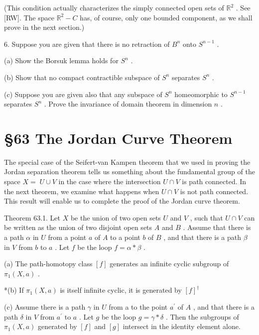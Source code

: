\documentclass[10pt]{article}
\begin{document}
(This condition actually characterizes the simply connected open sets of \({\mathbb{R}}^{2}\) . See [RW]. The space \({\mathbb{R}}^{2} - C\) has, of course, only one bounded component, as we shall prove in the next section.)

6. Suppose you are given that there is no retraction of \({B}^{n}\) onto \({S}^{n - 1}\) .

(a) Show the Borsuk lemma holds for \({S}^{n}\) .

(b) Show that no compact contractible subspace of \({S}^{n}\) separates \({S}^{n}\) .

(c) Suppose you are given also that any subspace of \({S}^{n}\) homeomorphic to \({S}^{n - 1}\) separates \({S}^{n}\) . Prove the invariance of domain theorem in dimension \(n\) .

\section*{§63 The Jordan Curve Theorem}

The special case of the Seifert-van Kampen theorem that we used in proving the Jordan separation theorem tells us something about the fundamental group of the space \(X = \; U \cup  V\) in the case where the intersection \(U \cap  V\) is path connected. In the next theorem, we examine what happens when \(U \cap  V\) is not path connected. This result will enable us to complete the proof of the Jordan curve theorem.

Theorem 63.1. Let \(X\) be the union of two open sets \(U\) and \(V\) , such that \(U \cap  V\) can be written as the union of two disjoint open sets \(A\) and \(B\) . Assume that there is a path \(\alpha\) in \(U\) from a point \(a\) of \(A\) to a point \(b\) of \(B\) , and that there is a path \(\beta\) in \(V\) from \(b\) to \(a\) . Let \(f\) be the loop \(f = \alpha  * \beta\) .

(a) The path-homotopy class \(\left\lbrack  f\right\rbrack\) generates an infinite cyclic subgroup of \({\pi }_{1}\left( {X,a}\right)\) .

*(b) If \({\pi }_{1}\left( {X,a}\right)\) is itself infinite cyclic, it is generated by \({\left\lbrack  f\right\rbrack  }^{ \dagger  }\)

(c) Assume there is a path \(\gamma\) in \(U\) from a to the point \({a}^{\prime }\) of \(A\) , and that there is a path \(\delta\) in \(V\) from \({a}^{\prime }\) to \(a\) . Let \(g\) be the loop \(g = \gamma  * \delta\) . Then the subgroups of \({\pi }_{1}\left( {X,a}\right)\) generated by \(\left\lbrack  f\right\rbrack\) and \(\left\lbrack  g\right\rbrack\) intersect in the identity element alone.
\end{document}
